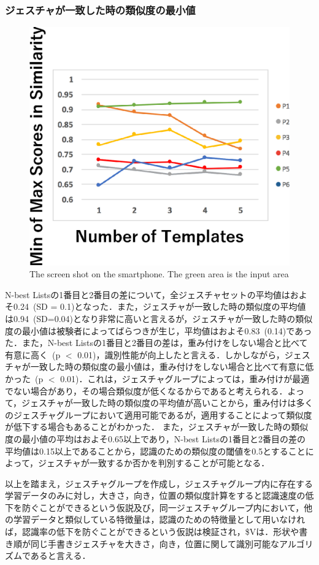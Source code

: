 \subsubsection{ジェスチャが一致した時の類似度の最小値}
\begin{figure}[!h]
\centering
\includegraphics[width=0.7\columnwidth]{img/rec_min.eps}
\caption{The screen shot on the smartphone. The green area is the input area}
\label{fig:rare_rec}
\end{figure}

N-best Listsの1番目と2番目の差について，全ジェスチャセットの平均値はおよそ0.24~(SD = 0.1)となった．また，ジェスチャが一致した時の類似度の平均値は0.94~(SD=0.04)となり非常に高いと言えるが，ジェスチャが一致した時の類似度の最小値は被験者によってばらつきが生じ，平均値はおよそ0.83~(0.14)であった．また，N-best Listsの1番目と2番目の差は，重み付けをしない場合と比べて有意に高く~(p $<$ 0.01)，識別性能が向上したと言える．しかしながら，ジェスチャが一致した時の類似度の最小値は，重み付けをしない場合と比べて有意に低かった~(p $<$ 0.01)．これは，ジェスチャグループによっては，重み付けが最適でない場合があり，その場合類似度が低くなるからであると考えられる．よって，ジェスチャが一致した時の類似度の平均値が高いことから，重み付けは多くのジェスチャグループにおいて適用可能であるが，適用することによって類似度が低下する場合もあることがわかった．
また，ジェスチャが一致した時の類似度の最小値の平均はおよそ0.65以上であり，N-best Listsの1番目と2番目の差の平均値は0.15以上であることから，認識のための類似度の閾値を0.5とすることによって，ジェスチャが一致するか否かを判別することが可能となる．

以上を踏まえ，ジェスチャグループを作成し，ジェスチャグループ内に存在する学習データのみに対し，大きさ，向き，位置の類似度計算をすると認識速度の低下を防ぐことができるという仮説及び，同一ジェスチャグループ内において，他の学習データと類似している特徴量は，認識のための特徴量として用いなければ，認識率の低下を防ぐことができるという仮説は検証され，\$Vは．形状や書き順が同じ手書きジェスチャを大きさ，向き，位置に関して識別可能なアルゴリズムであると言える．

